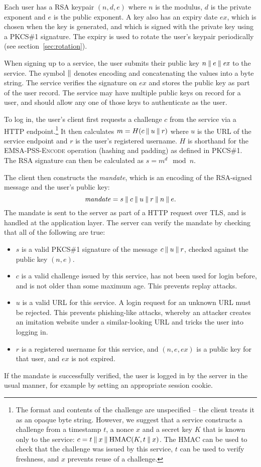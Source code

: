 Each user has a RSA keypair $(n, d, e)$ where $n$ is the modulus, $d$ is the private exponent and
$e$ is the public exponent. A key also has an expiry date $\mathit{ex}$, which is chosen when the
key is generated, and which is signed with the private key using a PKCS\#1 signature. The expiry is
used to rotate the user's keypair periodically (see section~\ref{sec:rotation}).

When signing up to a service, the user submits their public key $n \mathbin{\|} e \mathbin{\|} \mathit{ex}$ to
the service. The symbol $\mathbin{\|}$ denotes encoding and concatenating the values into a byte string.
The service verifies the signature on $\mathit{ex}$ and stores the public key as part of the user
record. The service may have multiple public keys on record for a user, and should allow any one of
those keys to authenticate as the user.

To log in, the user's client first requests a challenge $c$ from the service via a HTTP
endpoint.\footnote{The format and contents of the challenge are unspecified -- the client treats it
as an opaque byte string. However, we suggest that a service constructs a challenge from a
timestamp $t$, a nonce $x$ and a secret key $K$ that is known only to the service:
$c = t \mathbin{\|} x \mathbin{\|} \mathrm{HMAC}(K, t \mathbin{\|} x)$. The HMAC can be used to check that the
challenge was issued by this service, $t$ can be used to verify freshness, and $x$ prevents reuse of
a challenge.} It then calculates $m = H(c \mathbin{\|} u \mathbin{\|} r)$ where $u$ is the URL of the service endpoint and
$r$ is the user's registered username. $H$ is shorthand for the \textsc{EMSA-PSS-Encode} operation
(hashing and padding) as defined in PKCS\#1.~\cite{PKCS1} The RSA signature can then be calculated
as $s = m^d \mod n$.

The client then constructs the \emph{mandate}, which is an encoding of the RSA-signed message and
the user's public key: $$\mathit{mandate} = s \mathbin{\|} c \mathbin{\|} u \mathbin{\|} r \mathbin{\|} n \mathbin{\|} e.$$
The mandate is sent to the server as part of a HTTP request over TLS, and is handled at the
application layer. The server can verify the mandate by checking that all of the following are true:
\begin{itemize}
\item $s$ is a valid PKCS\#1 signature of the message $c \mathbin{\|} u \mathbin{\|} r$, checked against the
public key $(n, e)$.
\item $c$ is a valid challenge issued by this service, has not been used for login before, and is
not older than some maximum age. This prevents replay attacks.
\item $u$ is a valid URL for this service. A login request for an unknown URL must be rejected.
This prevents phishing-like attacks, whereby an attacker creates an imitation website under a
similar-looking URL and tricks the user into logging in.
\item $r$ is a registered username for this service, and $(n, e, \mathit{ex})$ is a public key for
that user, and $\mathit{ex}$ is not expired.
\end{itemize}
If the mandate is successfully verified, the user is logged in by the server in the usual manner,
for example by setting an appropriate session cookie.

